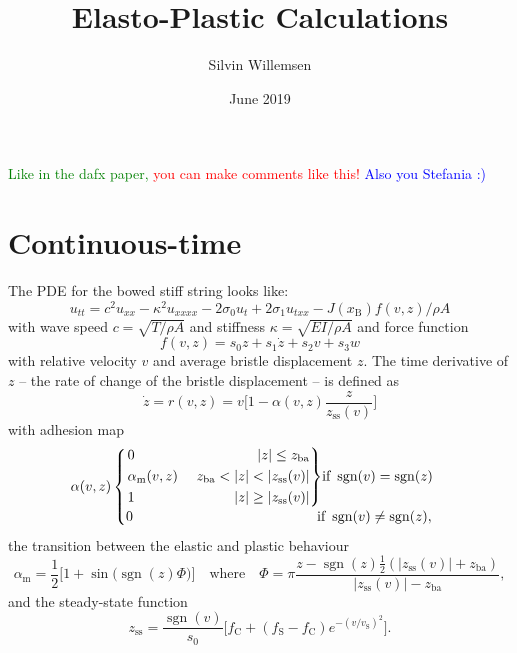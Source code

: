 \documentclass{article}
\title{Elasto-Plastic Calculations}
\author{Silvin Willemsen}
\date{June 2019}
\newenvironment{rcases}
  {\left.\begin{alignedat}{2}}
  {\end{alignedat}\right\rbrace}
\DeclareMathOperator{\sgn}{sgn}
\def\SBcomment[#1]{\textcolor{Red}{#1}}
\def\SWcomment[#1]{\textcolor{Green}{#1}}
\def\SScomment[#1]{\textcolor{Blue}{#1}}
\begin{document}
\maketitle
\noindent\SWcomment[Like in the dafx paper, ]\SBcomment[you can make comments like this!] \SScomment[Also you Stefania :)]
\section{Continuous-time}\label{sec:continuous}
The PDE for the bowed stiff string looks like:
\begin{equation}
    u_{tt} = c^2u_{xx}-\kappa^2u_{xxxx}-2\sigma_0u_t+2\sigma_1u_{txx}-J(x_\text{B})f(v,z)/\rho A
\end{equation}
with wave speed $c = \sqrt{T/\rho A}$ and stiffness $\kappa = \sqrt{EI/\rho A}$ and force function
\begin{equation}
    f(v, z) = s_0z + s_1\dot z + s_2v + s_3w
\end{equation}
with relative velocity $v$ and average bristle displacement $z$. The time derivative of $z$ -- the rate of change of the bristle displacement -- is defined as
\begin{equation}\label{eq:zdot}
    \dot z = r(v,z) = v\bigg[1-\alpha(v, z)\frac{z}{z_\text{ss}(v)}\bigg]
\end{equation}
with adhesion map
\begin{equation}\label{eq:alpha}
\alpha(v, z) 
    \begin{cases}
    \begin{rcases}
        &0 & |z| \leq z_\text{ba}\\
       &\alpha_\text{m}(v,z)&\quad \  z_\text{ba}<|z|<|z_\text{ss}(v)|\\
        &1 &|z|\geq |z_\text{ss}(v)|
        \end{rcases}\text{if}\  \sgn(v)=\sgn(z)\\
        0\qquad \qquad \qquad \qquad \qquad \qquad \quad \, \text{if}\  \sgn(v)\neq\sgn(z),
    \end{cases}
\end{equation}
the transition between the elastic and plastic behaviour
\begin{equation}
    \alpha_\text{m} = \frac{1}{2}\big[1+\sin\big(\sgn(z)\Phi\big)\big]\quad \text{where}\quad \Phi = \pi\frac{z-\sgn(z)\frac{1}{2}(|z_\text{ss}(v)|+z_\text{ba})}{|z_\text{ss}(v)|-z_\text{ba}},
\end{equation}
and the steady-state function
\begin{equation}\label{eq:zss}
    z_\text{ss} = \frac{\sgn(v)}{s_0}\Big[f_\text{C}+(f_\text{S}-f_\text{C})e^{-(v/v_\text{S})^2}\Big].
\end{equation}
\end{document}

